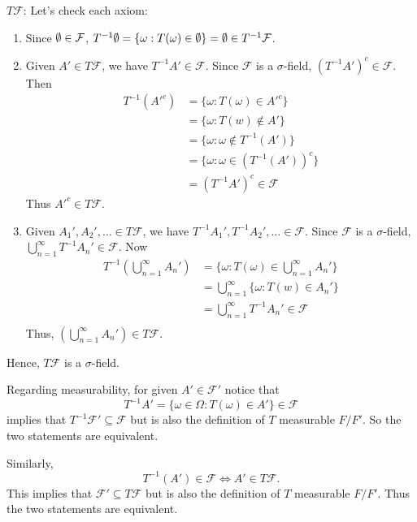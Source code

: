 \documentclass[12pt]{article}
\begin{document}
\begin{problem}[1]
\begin{enumerate}[label=\alph*)]
	$ T\mathcal{F}$: Let's check each axiom:
		\begin{enumerate}[label=(\roman*)]
			\item Since $ \emptyset \in \mathcal{F}$, $ T^{-1} \emptyset = \{\omega: T(\omega) \in \emptyset\} = \emptyset \in T^{-1} \mathcal{F} $.
			\item Given $ A' \in T\mathcal{F}$, we have $ T^{-1}A' \in \mathcal{F}$. Since $ \mathcal{F}$ is a $\sigma$-field, $ (T^{-1}A')^{c} \in \mathcal{F}$. Then
				\begin{align*}
					T^{-1}(A'^{c}) &= \{\omega:T(\omega) \in A'^{c}\}  \\
					&= \{\omega: T(w) \not\in A'\}  \\
					&= \{\omega:\omega \not\in T^{-1}(A')\}  \\
					&= \{\omega: \omega \in \left( T^{-1} (A') \right) ^{c}\}  \\
					&= (T^{-1}A')^{c} \in \mathcal{F}
				\end{align*}
				Thus $ A'^{c} \in T\mathcal{F}$.
			\item Given $ A_1',A_2',\ldots \in T\mathcal{F}$, we have $T^{-1}A_1', T^{-1}A_2',\ldots \in \mathcal{F}$. Since $ \mathcal{F}$ is a $\sigma$-field, $ \bigcup_{ n =1}^{\infty} T^{-1}A_n' \in \mathcal{F}$. Now
				\begin{align*}
					T^{-1} \left(\bigcup_{ n =1}^{\infty} A_n'\right) &= \{\omega: T( \omega) \in \bigcup_{ n =1}^{\infty} A_n'\}  \\
									     &= \bigcup_{ n =1}^{\infty}  \{\omega: T(w) \in A_n'\}  \\
									     &= \bigcup_{ n =1}^{\infty} T^{-1} A_n' \in \mathcal{F} \\
				\end{align*}
Thus, $ \left( \bigcup_{ n =1}^{\infty} A_n' \right) \in T\mathcal{F} $.
		\end{enumerate}
		Hence, $ T\mathcal{F}$ is a $\sigma$-field.

		Regarding measurability, for given $ A' \in \mathcal{F}'$ notice that
		\[
			T^{-1}A' = \{\omega \in \Omega: T(\omega) \in A'\} \in \mathcal{F} 
		\] implies that $ T^{-1}\mathcal{F}' \subseteq \mathcal{F}$ but is also the definition of $ T$ measurable  $ F /F'$. So the two statements are equivalent.

		Similarly, 
		\[
			T^{-1}(A') \in \mathcal{F} \iff A' \in T\mathcal{F}
		.\] This implies that $ \mathcal{F}' \subseteq T\mathcal{F}$ but is also the definition of $ T $ measurable  $ F /F'$. Thus the two statements are equivalent.


\end{enumerate}
\end{problem}
\end{document}
